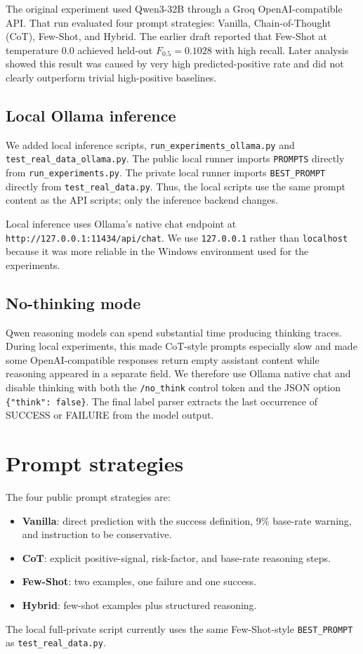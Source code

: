 \documentclass{article}
\begin{document}
The original experiment used Qwen3-32B through a Groq OpenAI-compatible API.
That run evaluated four prompt strategies: Vanilla, Chain-of-Thought (CoT),
Few-Shot, and Hybrid. The earlier draft reported that Few-Shot at temperature
0.0 achieved held-out $F_{0.5}=0.1028$ with high recall. Later analysis showed
this result was caused by very high predicted-positive rate and did not clearly
outperform trivial high-positive baselines.

\subsection{Local Ollama inference}

We added local inference scripts, \texttt{run\_experiments\_ollama.py} and
\texttt{test\_real\_data\_ollama.py}. The public local runner imports
\texttt{PROMPTS} directly from \texttt{run\_experiments.py}. The private local
runner imports \texttt{BEST\_PROMPT} directly from \texttt{test\_real\_data.py}.
Thus, the local scripts use the same prompt content as the API scripts; only the
inference backend changes.

Local inference uses Ollama's native chat endpoint at
\texttt{http://127.0.0.1:11434/api/chat}. We use \texttt{127.0.0.1} rather than
\texttt{localhost} because it was more reliable in the Windows environment used
for the experiments.

\subsection{No-thinking mode}

Qwen reasoning models can spend substantial time producing thinking traces.
During local experiments, this made CoT-style prompts especially slow and made
some OpenAI-compatible responses return empty assistant content while reasoning
appeared in a separate field. We therefore use Ollama native chat and disable
thinking with both the \texttt{/no\_think} control token and the JSON option
\texttt{\{"think": false\}}. The final label parser extracts the last occurrence
of SUCCESS or FAILURE from the model output.

\section{Prompt strategies}

The four public prompt strategies are:
\begin{itemize}
    \item \textbf{Vanilla}: direct prediction with the success definition, 9\%
    base-rate warning, and instruction to be conservative.
    \item \textbf{CoT}: explicit positive-signal, risk-factor, and base-rate
    reasoning steps.
    \item \textbf{Few-Shot}: two examples, one failure and one success.
    \item \textbf{Hybrid}: few-shot examples plus structured reasoning.
\end{itemize}
The local full-private script currently uses the same Few-Shot-style
\texttt{BEST\_PROMPT} as \texttt{test\_real\_data.py}.
\end{document}
